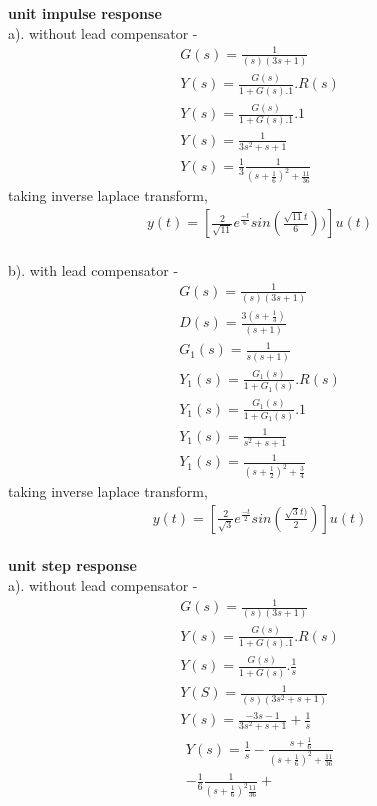 \begin{enumerate}[label=\thesection.\arabic*.,ref=\thesection.\theenumi]
\textbf{unit impulse response}\\
a). without lead compensator - \\
\begin{align}
G(s) = \frac{1}{(s)(3s+1)}\\
Y(s) = \frac{G(s)}{1+G(s).1}.R(s)\\
Y(s) = \frac{G(s)}{1+G(s).1}.1\\
Y(s) = \frac{1}{3s^2+s+1}\\
Y(s) = \frac{1}{3}\frac{1}{(s+\frac{1}{6})^2 + \frac{11}{36}}
\end{align}
taking inverse laplace transform, \\
\begin{align}
y(t) = [\frac{2}{\sqrt{11}}e^{\frac{-t}{6}}sin(\frac{\sqrt{11}t}{6}))]u(t)
\end{align}
\\
b). with lead compensator - \\
\begin{align}
G(s) = \frac{1}{(s)(3s+1)}\\
D(s) = \frac{3(s+\frac{1}{3})}{(s+1)} \\
G_{1}(s) = \frac{1}{s(s+1)}\\
Y_{1}(s) = \frac{G_{1}(s)}{1+G_{1}(s)}.R(s)\\
Y_{1}(s) = \frac{G_{1}(s)}{1+G_{1}(s)}.1\\
Y_{1}(s) = \frac{1}{s^2+s+1}\\
Y_{1}(s) = \frac{1}{(s+\frac{1}{2})^2 + \frac{3}{4}} 
\end{align}
taking inverse laplace transform, \\
\begin{align}
y(t) = [\frac{2}{\sqrt{3}}e^{\frac{-t}{2}}sin(\frac{\sqrt{3}t)}{2})]u(t)
\end{align}
\\
\textbf{unit step response}\\
a). without lead compensator - \\
\begin{align}
G(s) = \frac{1}{(s)(3s+1)}\\
Y(s) = \frac{G(s)}{1+G(s).1}.R(s)\\
Y(s) = \frac{G(s)}{1+G(s)}.\frac{1}{s}\\
Y(S) = \frac{1}{(s)(3s^2+s+1)}\\
Y(s) = \frac{-3s-1}{3s^2+s+1} + \frac{1}{s}
\end{align}
\begin{equation}
\begin{split}
Y(s) = \frac{1}{s} - \frac{s+\frac{1}{6}}{(s+\frac{1}{6})^2 + \frac{11}{36}}\\ -\frac{1}{6}\frac{1}{(s+\frac{1}{6})^2  \frac{11}{36}}+

\end{split}
\end{equation}
\end{enumerate}
